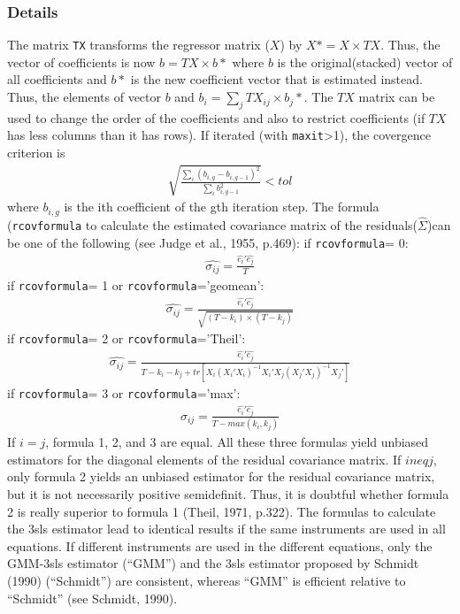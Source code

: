 \documentclass[12pt]{book}%
\begin{document}
\subsubsection{Details}
The matrix \texttt{TX} transforms the regressor matrix ($X$) by $X\ast=X \times TX$. Thus,
the vector of coefficients is now $b=TX \times b\ast$ where $b$ is the original(stacked) 
vector of all coefficients and $b\ast$ is the new coefficient vector that is estimated instead.
Thus, the elements of vector $b$ and $b_i = \sum_j TX_{ij}\times b_j\ast$. The $TX$ matrix can be
used to change the order of the coefficients and also to restrict coefficients (if $TX$ has 
less columns than it has rows). 
If iterated (with \texttt{maxit}>1), the covergence criterion is
\begin{eqnarray*}
\sqrt{\frac{\sum_i(b_{i,g}-b_{i,g-1})^2}{\sum_ib_{i,g-1}^2}} < tol
\end{eqnarray*}
where $b_{i,g}$ is the ith coefficient of the gth iteration step.
The formula (\texttt{rcovformula} to calculate the estimated covariance matrix of the residuals($\hat{\Sigma}$)can be one
of the following (see Judge et al., 1955, p.469):
if \texttt{rcovformula}= 0:
\begin{eqnarray*}
\hat{\sigma_{ij}}= \frac{\hat{e_i}\prime\hat{e_j}}{T}
\end{eqnarray*}
if \texttt{rcovformula}= 1 or \texttt{rcovformula}='geomean':
\begin{eqnarray*}
\hat{\sigma_{ij}}= \frac{\hat{e_i}\prime\hat{e_j}}{\sqrt{(T-k_i)\times (T-k_j)}}
\end{eqnarray*}
if \texttt{rcovformula}= 2 or \texttt{rcovformula}='Theil':
\begin{eqnarray*}
\hat{\sigma_{ij}}= \frac{\hat{e_i}\prime\hat{e_j}}{T-k_i-k_j+tr[X_i(X_i\prime X_i)^{-1}X_i\prime X_j(X_j\prime X_j)^{-1}X_j\prime]}
\end{eqnarray*}
if \texttt{rcovformula}= 3 or \texttt{rcovformula}='max':
\begin{eqnarray*}
\hat{\sigma_{ij}}= \frac{\hat{e_i}\prime\hat{e_j}}{T-max(k_i,k_j)}
\end{eqnarray*}
If $i = j$, formula 1, 2, and 3 are equal. All these three formulas yield unbiased estimators
for the diagonal elements of the residual covariance matrix. If $i neq j$, only formula 2
yields an unbiased estimator for the residual covariance matrix, but it is not necessarily
positive semidefinit. Thus, it is doubtful whether formula 2 is really superior to formula 1
(Theil, 1971, p.322).
The formulas to calculate the 3sls estimator lead to identical results 
if the same instruments are used in all equations. If different instruments 
are used in the different equations, only the GMM-3sls estimator (``GMM'') 
and the 3sls estimator proposed by Schmidt (1990) (``Schmidt'') are consistent, whereas 
``GMM'' is efficient relative to ``Schmidt'' (see Schmidt, 1990).
\end{document}
